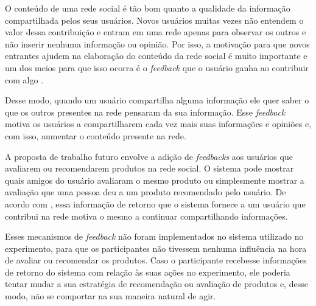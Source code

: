  O conteúdo de uma rede social é tão bom quanto a qualidade da informação compartilhada pelos seus usuários. Novos usuários muitas vezes não entendem o valor dessa contribuição e entram em uma rede apenas para observar os outros e não inserir nenhuma informação ou opinião. Por isso, a motivação para que novos entrantes ajudem na elaboração do conteúdo da rede social é muito importante e um dos meios para que isso ocorra é o \textit{feedback} que o usuário ganha ao contribuir com algo \cite{burke2009fmm}.
 
 Desse modo, quando um usuário compartilha alguma informação ele quer saber o que os outros presentes na rede pensaram da sua informação. Esse \textit{feedback} motiva os usuários a compartilharem cada vez mais suas informações e opiniões e, com isso, aumentar o conteúdo presente na rede.
 
 A proposta de trabalho futuro envolve a adição de \textit{feedbacks} aos usuários que avaliarem ou recomendarem produtos na rede social. O sistema pode mostrar quais amigos do usuário avaliaram o mesmo produto ou simplesmente mostrar a avaliação que uma pessoa deu a um produto recomendado pelo usuário. De acordo com \cite{burke2009fmm}, essa informação de retorno que o sistema fornece a um usuário que contribui na rede motiva o mesmo a continuar compartilhando informações.
 
 Esses mecanismos de \textit{feedback} não foram implementados no sistema utilizado no experimento, para que os participantes não tivessem nenhuma influência na hora de avaliar ou recomendar os produtos. Caso o participante recebesse informações de retorno do sistema com relação às suas ações no experimento, ele poderia tentar mudar a sua estratégia de recomendação ou avaliação de produtos e, desse modo, não se comportar na sua maneira natural de agir.




